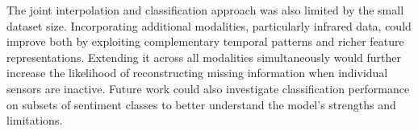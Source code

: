 \documentclass{article}
\begin{document}
The joint interpolation and classification approach was also limited by the small dataset size. Incorporating additional modalities, particularly infrared data, could improve both by exploiting complementary temporal patterns and richer feature representations. Extending it across all modalities simultaneously would further increase the likelihood of reconstructing missing information when individual sensors are inactive. Future work could also investigate classification performance on subsets of sentiment classes to better understand the model's strengths and limitations.




\end{document}
